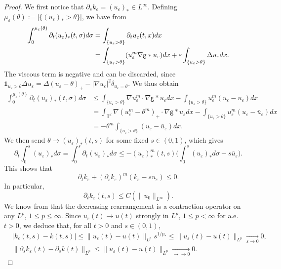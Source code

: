 \documentclass[11pt]{article}
\numberwithin{equation}{section} %
\newcommand{\p}{{\partial}}
\renewcommand{\d}{\delta}
\newcommand{\T}{{\mathbb{T}}}
\newcommand{\g}{{\mathsf{g}}}
\newcommand{\D}{\Delta}
\newcommand{\ep}{\varepsilon}
\let\div\relax
\DeclareMathOperator{\div}{\mathsf{div}}
\def \ep{\varepsilon}
\def\nab{\nabla}
\def\indic{\mathbf{1}}
\begin{document}
\begin{proof}
    We first notice that $\p_s k_\ep =( u_\ep)_* \in L^\infty$. Defining $\mu_\ep(\theta) := |\{(u_\ep)_* >\theta \}|$, we have from \cite[Corollary 9.2.1]{Rakotoson2008}
    \begin{align*}
        \int_0^{\mu_\ep(\theta)}\p_t (u_\ep)_*(t,\sigma)d\sigma &= \int_{\{u_\ep >\theta \}} \p_t u_\ep(t,x)dx \\
        &= \int_{\{u_\ep>\theta \}}\div(u_\ep^m\nab\g\ast u_\ep)dx + \ep\int_{\{u_\ep>\theta \}} \D u_\ep dx.
    \end{align*}
    The viscous term is negative and can be discarded, since $\indic_{u_\ep>\theta }\D u_\ep = \D (u_\ep-\theta)_+ - |\nab u_\ep|^2 \d_{u_\ep = \theta}$. We thus obtain
    \begin{align*}
        \int_0^{\mu_\ep(\theta)}\p_t (u_\ep)_*(t,\sigma)d\sigma & \le \int_{\{u_\ep>\theta \}} \nab u_\ep^m\cdot\nab \g\ast u_\ep dx - \int_{\{u_\ep>\theta \}} u_\ep^m (u_\ep-\bar u_\ep)dx \\
        &= \int_{\T^d} \nab (u_\ep^m-\theta^m)_+\cdot\nab\g\ast u_\ep dx - \int_{\{u_\ep>\theta \}} u_\ep^m (u_\ep-\bar u_\ep)dx \\
        &= -\theta^m \int_{\{u_\ep>\theta\}} (u_\ep-\bar u_\ep)dx.
    \end{align*}
    We then send $\theta\to (u_\ep)_* (t,s)$ for some fixed $s\in (0,1)$, which gives
    \begin{equation*}
        \p_t \int_0^s (u_\ep)_* d\sigma = \int_0^s \p_t(u_\ep)_* d\sigma \le -( u_\ep)_*^m(t,s) \bigg(\int_0^s (u_\ep)_* d\sigma - s \bar u_\ep \bigg).
    \end{equation*}
    This shows that
    \begin{equation*}
        \p_t k_\ep + (\p_s k_\ep)^m(k_\ep - s\bar u_\ep) \le 0.
    \end{equation*}
    In particular, 
    \begin{equation*}
        \p_t k_\ep(t,s) \le C(\|u_0\|_{L^\infty}).
    \end{equation*}
    We know from \cite[Theorem 1.3.1]{Rakotoson2008} that the decreasing rearrangement is a contraction operator on any $L^p$, $1\le p\le \infty$. Since $u_\ep(t) \to u(t)$ strongly in $L^p$, $1\le p <\infty$ for a.e. $t>0$, we deduce that, for all $t>0$ and $s\in (0,1)$,
    \begin{align*}
       & |k_\ep(t,s)-k(t,s) |\le \| u_\ep(t)-u(t)\|_{L^p} s^{1/p_*} \le \| u_\ep(t)-u(t)\|_{L^p} \xrightarrow[\ep \to 0]{} 0, \\
       & \|\p_s k_\ep(t)-\p_s k(t)\|_{L^p}\le \| u_\ep(t)-u(t)\|_{L^p} \xrightarrow[\to\to 0]{}0.
    \end{align*}
    
\end{proof}
\end{document}
